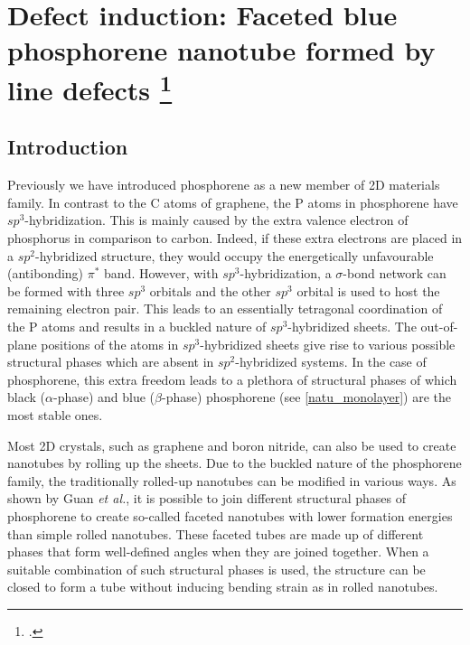 \section[Defect induction: Faceted blue phosphorene nanotube formed by line defects]{Defect induction: Faceted blue phosphorene nanotube formed by line defects \footcite[This work is published:][]{Aierken2015.nanotubes} \label{defect_phos}}

\subsection{Introduction}

Previously we have introduced phosphorene as a new member of 2D materials family. In contrast to the C atoms of graphene, the P atoms in phosphorene have $sp^3$-hybridization. This is mainly caused by the extra valence electron of phosphorus in comparison to carbon. Indeed, if these extra electrons are placed in a $sp^2$-hybridized structure, they would occupy the energetically unfavourable (antibonding) $\pi^*$ band. However, with $sp^3$-hybridization, a $\sigma$-bond network can be formed with three $sp^3$ orbitals and the other $sp^3$ orbital is used to host the remaining electron pair. This leads to an essentially tetragonal coordination of the P atoms and results in a buckled nature of $sp^3$-hybridized sheets. The out-of-plane positions of the atoms in $sp^3$-hybridized sheets give rise to various possible structural phases which are absent in $sp^2$-hybridized systems. In the case of phosphorene, this extra freedom leads to a plethora of structural phases\cite{Guan2014a,Wu2015} of which black ($\alpha$-phase) and blue ($\beta$-phase) phosphorene (see \autoref{natu_monolayer}) are the most stable ones.  

Most 2D crystals, such as graphene and boron nitride, can also be used to create nanotubes by rolling up the sheets. Due to the buckled nature of the phosphorene family, the traditionally rolled-up nanotubes can be modified in various ways. As shown by Guan \textit{et al.}\cite{Guan2014a}, it is possible to join different structural phases of phosphorene to create so-called faceted nanotubes with lower formation energies than simple rolled nanotubes. These faceted tubes are made up of different phases that form well-defined angles when they are joined together.  When a suitable combination of such structural phases is used, the structure can be closed to form a tube without inducing bending strain as in rolled nanotubes.

